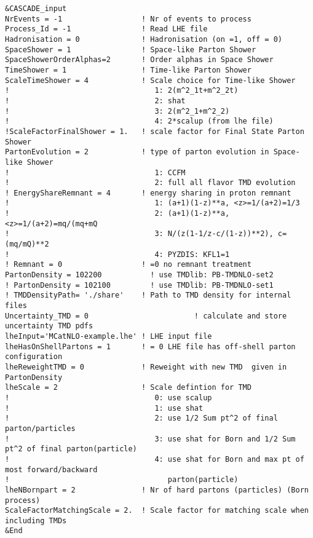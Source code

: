\documentclass[11pt]{article} \usepackage{mystyle-new}
\newenvironment{tolerant}[1]{\par\tolerance=#1\relax}{ \par }
\begin{document}
\begin{tolerant}{3000}
\begin{footnotesize}
\begin{verbatim}
&CASCADE_input
NrEvents = -1                  ! Nr of events to process
Process_Id = -1                ! Read LHE file
Hadronisation = 0              ! Hadronisation (on =1, off = 0)
SpaceShower = 1                ! Space-like Parton Shower
SpaceShowerOrderAlphas=2       ! Order alphas in Space Shower 
TimeShower = 1                 ! Time-like Parton Shower
ScaleTimeShower = 4            ! Scale choice for Time-like Shower
!                                 1: 2(m^2_1t+m^2_2t)
!                                 2: shat
!                                 3: 2(m^2_1+m^2_2)
!                                 4: 2*scalup (from lhe file)
!ScaleFactorFinalShower = 1.   ! scale factor for Final State Parton Shower
PartonEvolution = 2            ! type of parton evolution in Space-like Shower
!                                 1: CCFM
!                                 2: full all flavor TMD evolution
! EnergyShareRemnant = 4       ! energy sharing in proton remnant
!                                 1: (a+1)(1-z)**a, <z>=1/(a+2)=1/3
!                                 2: (a+1)(1-z)**a, <z>=1/(a+2)=mq/(mq+mQ
!                                 3: N/(z(1-1/z-c/(1-z))**2), c=(mq/mQ)**2
!                                 4: PYZDIS: KFL1=1
! Remnant = 0                  ! =0 no remnant treatment
PartonDensity = 102200           ! use TMDlib: PB-TMDNLO-set2
! PartonDensity = 102100         ! use TMDlib: PB-TMDNLO-set1
! TMDDensityPath= './share'    ! Path to TMD density for internal files
Uncertainty_TMD = 0                        ! calculate and store uncertainty TMD pdfs
lheInput='MCatNLO-example.lhe' ! LHE input file
lheHasOnShellPartons = 1       ! = 0 LHE file has off-shell parton configuration
lheReweightTMD = 0             ! Reweight with new TMD  given in PartonDensity
lheScale = 2                   ! Scale defintion for TMD
!                                 0: use scalup
!                                 1: use shat
!                                 2: use 1/2 Sum pt^2 of final parton/particles
!                                 3: use shat for Born and 1/2 Sum pt^2 of final parton(particle)
!                                 4: use shat for Born and max pt of most forward/backward 
!                                    parton(particle)
lheNBornpart = 2               ! Nr of hard partons (particles) (Born process)
ScaleFactorMatchingScale = 2.  ! Scale factor for matching scale when including TMDs
&End



\end{verbatim}
\end{footnotesize}
\end{tolerant}
\end{document}
